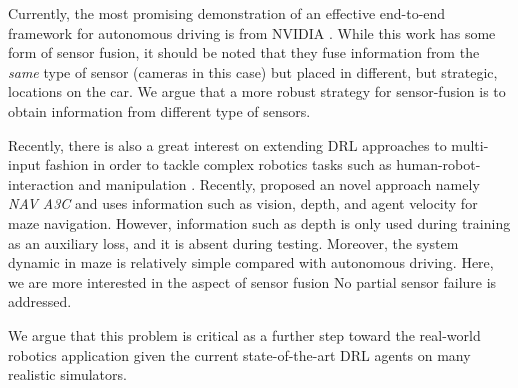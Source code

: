 \documentclass[../thesis.tex]{subfiles}
\begin{document}
Currently, the most promising demonstration of an effective end-to-end framework for autonomous driving is from NVIDIA \cite{nvidiacar}. While this work has some form of sensor fusion, it should be noted that they fuse information from the \textit{same} type of sensor (cameras in this case) but placed in different, but strategic, locations on the car. We argue that a more robust strategy for sensor-fusion is to obtain information from different type of sensors. 

Recently, there is also a great interest on extending DRL approaches to multi-input fashion in order to tackle complex robotics tasks such as human-robot-interaction \cite{qureshi2016robot} and manipulation \cite{levine2016end}. Recently, \citet{mirowski2017a} proposed an novel approach namely \textit{NAV A3C} and uses information such as vision, depth, and agent velocity for maze navigation. However, information such as depth is only used during training as an auxiliary loss, and it is absent during testing. Moreover, the system dynamic in maze is relatively simple compared with autonomous driving. Here, we are more interested 
in the aspect of sensor fusion
No partial sensor failure is addressed.


We argue that this problem is critical as a further step toward the real-world robotics application given the current state-of-the-art DRL agents on many realistic simulators. 

\end{document}
